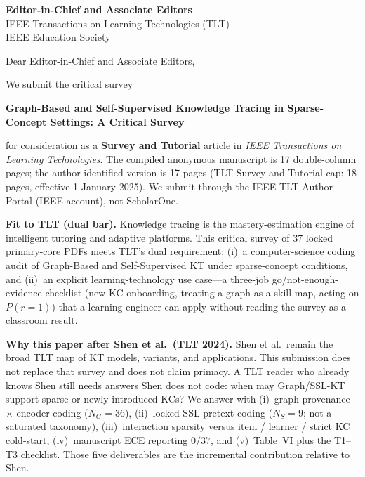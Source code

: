 \documentclass[11pt]{letter}
\date{November 10, 2026}
\begin{document}
\begin{letter}{
\textbf{Editor-in-Chief and Associate Editors}\\
IEEE Transactions on Learning Technologies (TLT)\\
IEEE Education Society
}

\opening{Dear Editor-in-Chief and Associate Editors,}

We submit the critical survey

\begin{center}
\textbf{Graph-Based and Self-Supervised Knowledge Tracing in Sparse-Concept Settings: A Critical Survey}
\end{center}

for consideration as a \textbf{Survey and Tutorial} article in \textit{IEEE Transactions on Learning Technologies}. The compiled anonymous manuscript is 17 double-column pages; the author-identified version is 17 pages (TLT Survey and Tutorial cap: 18 pages, effective 1 January 2025). We submit through the IEEE TLT Author Portal (IEEE account), not ScholarOne.

\textbf{Fit to TLT (dual bar).} Knowledge tracing is the mastery-estimation engine of intelligent tutoring and adaptive platforms. This critical survey of 37 locked primary-core PDFs meets TLT's dual requirement: (i)~a computer-science coding audit of Graph-Based and Self-Supervised KT under sparse-concept conditions, and (ii)~an explicit learning-technology use case---a three-job go/not-enough-evidence checklist (new-KC onboarding, treating a graph as a skill map, acting on $P(r{=}1)$) that a learning engineer can apply without reading the survey as a classroom result.

\textbf{Why this paper after Shen et al.\ (TLT 2024).} Shen et al.\ remain the broad TLT map of KT models, variants, and applications. This submission does not replace that survey and does not claim primacy. A TLT reader who already knows Shen still needs answers Shen does not code: when may Graph/SSL-KT support sparse or newly introduced KCs? We answer with (i)~graph provenance $\times$ encoder coding ($N_G=36$), (ii)~locked SSL pretext coding ($N_S=9$; not a saturated taxonomy), (iii)~interaction sparsity versus item / learner / strict KC cold-start, (iv)~manuscript ECE reporting $0/37$, and (v)~Table~VI plus the T1--T3 checklist. Those five deliverables are the incremental contribution relative to Shen.


\end{letter}
\end{document}
